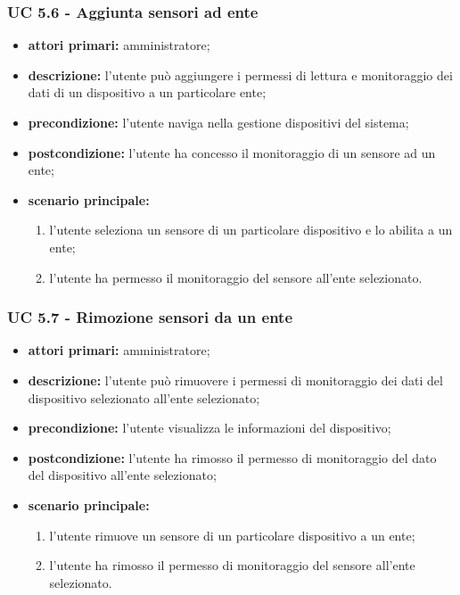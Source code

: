 			\subsubsection{UC 5.6 - Aggiunta sensori ad ente}
			\begin{itemize}
				\item \textbf{attori primari:} amministratore;
				\item \textbf{descrizione:} l'utente può aggiungere i permessi di lettura e monitoraggio dei dati di un dispositivo a un particolare ente;
				\item \textbf{precondizione:} l'utente naviga nella gestione dispositivi del sistema;
				\item \textbf{postcondizione:} l'utente ha concesso il monitoraggio di un sensore ad un ente;
				\item \textbf{scenario principale:}
				\begin{enumerate}
					\item{l'utente seleziona un sensore di un particolare dispositivo e lo abilita a un ente;}
					\item{l'utente ha permesso il monitoraggio del sensore all'ente selezionato.}
				\end{enumerate}
			\end{itemize}

			\subsubsection{UC 5.7 - Rimozione sensori da un ente}
			\begin{itemize}
				\item \textbf{attori primari:} amministratore;
				\item \textbf{descrizione:} l'utente può rimuovere i permessi di monitoraggio dei dati del dispositivo selezionato all'ente selezionato;
				\item \textbf{precondizione:} l'utente visualizza le informazioni del dispositivo;
				\item \textbf{postcondizione:} l'utente ha rimosso il permesso di monitoraggio del dato del dispositivo all'ente selezionato;
				\item \textbf{scenario principale:}
				\begin{enumerate}
					\item{l'utente rimuove un sensore di un particolare dispositivo a un ente;}
					\item{l'utente ha rimosso il permesso di monitoraggio del sensore all'ente selezionato.}
				\end{enumerate}
			\end{itemize}

